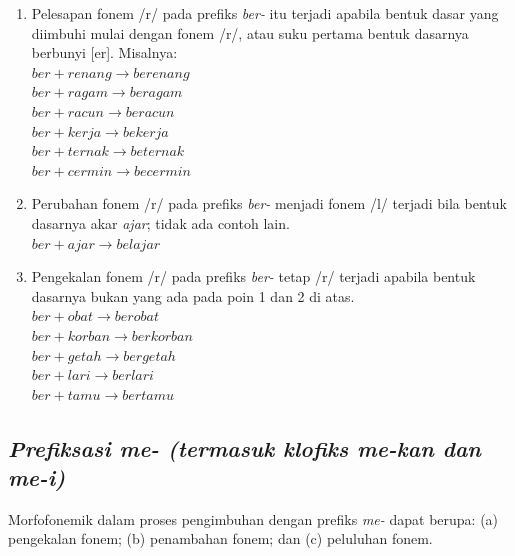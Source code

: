 \begin{enumerate}

	\item Pelesapan fonem /r/ pada prefiks \textit{ber-} itu terjadi apabila bentuk dasar yang diimbuhi mulai dengan fonem /r/, atau suku pertama bentuk dasarnya berbunyi [er]. Misalnya:\\
	$ber + renang \rightarrow berenang$\\
	$ber + ragam \rightarrow beragam$\\
	$ber + racun \rightarrow beracun$\\
	$ber + kerja \rightarrow bekerja$\\
	$ber + ternak \rightarrow beternak$\\
	$ber + cermin \rightarrow becermin$
	
	\item Perubahan fonem /r/ pada prefiks \textit{ber-} menjadi fonem /l/ terjadi bila bentuk dasarnya akar \textit{ajar}; tidak ada contoh lain.\\
	$ber + ajar \rightarrow belajar$
	
	\item Pengekalan fonem /r/ pada prefiks \textit{ber-} tetap /r/ terjadi apabila bentuk dasarnya bukan yang ada pada poin 1 dan 2 di atas.\\
	$ber + obat \rightarrow berobat$\\
	$ber + korban \rightarrow berkorban$\\
	$ber + getah \rightarrow bergetah$\\
	$ber + lari \rightarrow berlari$\\
	$ber + tamu \rightarrow bertamu$
	
\end{enumerate}


\subsection{\textit{Prefiksasi me- (termasuk klofiks me-kan dan me-i)}}
\label{sec:prefiksasiMe-}

Morfofonemik dalam proses pengimbuhan dengan prefiks \textit{me-} dapat berupa: (a) pengekalan fonem; (b) penambahan fonem; dan (c) peluluhan fonem.

